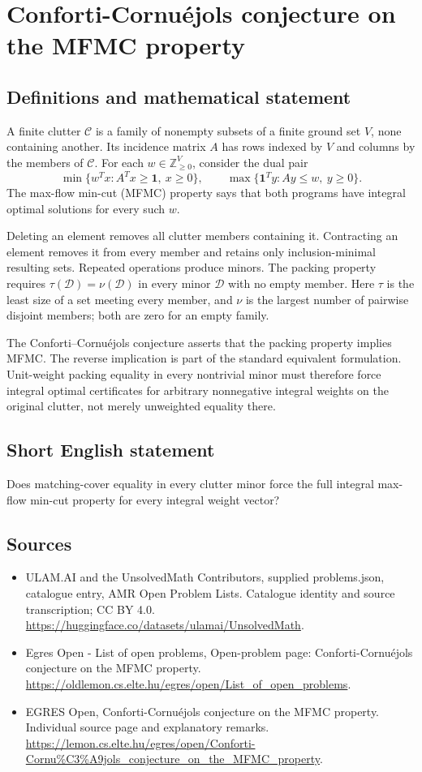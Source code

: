 \documentclass[11pt,a4paper]{article}
\begin{document}
\section*{Conforti-Cornuéjols conjecture on the MFMC property}\label{statement}

\subsection{Definitions and mathematical statement}
A finite clutter $\mathcal C$ is a family of nonempty subsets of a finite
ground set $V$, none containing another. Its incidence matrix $A$ has
rows indexed by $V$ and columns by the members of $\mathcal C$.
For each $w\in\mathbb Z_{\ge0}^V$, consider the dual pair
\[
 \min\{w^Tx:A^Tx\ge\mathbf1,\ x\ge0\},\qquad
 \max\{\mathbf1^Ty:Ay\le w,\ y\ge0\}.
\]
The max-flow min-cut (MFMC) property says that both programs have
integral optimal solutions for every such $w$.

Deleting an element removes all clutter members containing it.
Contracting an element removes it from every member and retains only
inclusion-minimal resulting sets. Repeated operations produce minors.
The packing property requires $\tau(\mathcal D)=\nu(\mathcal D)$ in every
minor $\mathcal D$ with no empty member. Here $\tau$ is the least size
of a set meeting every member, and $\nu$ is the largest number of
pairwise disjoint members; both are zero for an empty family.

The Conforti--Cornu\'{e}jols conjecture asserts that the packing property
implies MFMC. The reverse implication is part of the standard equivalent
formulation. Unit-weight packing equality in every nontrivial minor
must therefore force integral optimal certificates for arbitrary
nonnegative integral weights on the original clutter, not merely
unweighted equality there.
\subsection{Short English statement}
Does matching-cover equality in every clutter minor force the
full integral max-flow min-cut property for every integral weight vector?
\subsection{Sources}
\begin{itemize}
\item[S1] ULAM.AI and the UnsolvedMath Contributors, supplied problems.json, catalogue entry, AMR Open Problem Lists. Catalogue identity and source transcription; CC BY 4.0.
\url{https://huggingface.co/datasets/ulamai/UnsolvedMath}.
\item[S2] Egres Open - List of open problems, Open-problem page: Conforti-Cornuéjols conjecture on the MFMC property. 
\url{https://oldlemon.cs.elte.hu/egres/open/List_of_open_problems}.
\item[S3] EGRES Open, Conforti-Cornuéjols conjecture on the MFMC property. Individual source page and explanatory remarks.
\url{https://lemon.cs.elte.hu/egres/open/Conforti-Cornu%C3%A9jols_conjecture_on_the_MFMC_property}.
\end{itemize}
\end{document}
